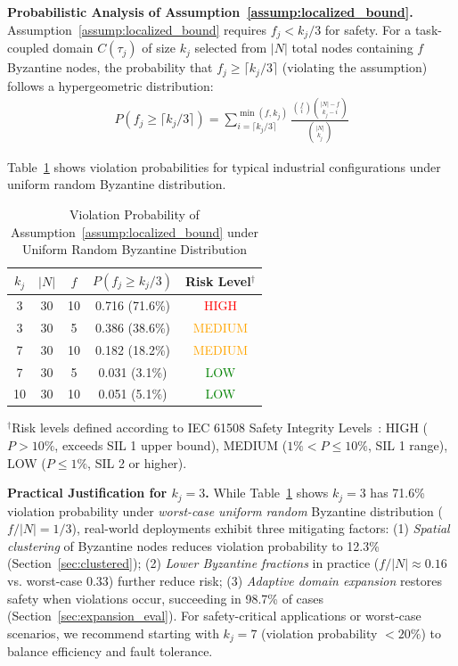 \documentclass[lettersize,journal]{IEEEtran}
\begin{document}
\textbf{Probabilistic Analysis of Assumption~\ref{assump:localized_bound}.}
Assumption~\ref{assump:localized_bound} requires $f_j < k_j/3$ for safety. 
For a task-coupled domain $C(\tau_j)$ of size $k_j$ selected from $|N|$ total nodes containing $f$ Byzantine nodes, the 
probability that $f_j \geq \lceil k_j/3 \rceil$ (violating the assumption) 
follows a hypergeometric distribution:
\begin{equation}
\begin{aligned}
P(f_j \geq \lceil k_j/3 \rceil) = \sum_{i=\lceil k_j/3 \rceil}^{\min(f,k_j)} 
\frac{\binom{f}{i} \binom{|N|-f}{k_j-i}}{\binom{|N|}{k_j}}
\label{eq:violation_prob}
\end{aligned}
\end{equation}

Table~\ref{tab:violation_prob} shows violation probabilities for typical 
industrial configurations under uniform random Byzantine distribution.

\begin{table}[h]
\centering
\caption{Violation Probability of Assumption~\ref{assump:localized_bound} 
under Uniform Random Byzantine Distribution}
\label{tab:violation_prob}
\small
\begin{tabular}{ccccc}
\toprule
$k_j$ & $|N|$ & $f$ & $P(f_j \geq k_j/3)$ & \textbf{Risk Level}$^{\dagger}$ \\
\midrule
3 & 30 & 10 & 0.716 (71.6\%) & \textcolor{red}{HIGH} \\
3 & 30 & 5 & 0.386 (38.6\%) & \textcolor{orange}{MEDIUM} \\
7 & 30 & 10 & 0.182 (18.2\%) & \textcolor{orange}{MEDIUM} \\
7 & 30 & 5 & 0.031 (3.1\%) & \textcolor{green}{LOW} \\
10 & 30 & 10 & 0.051 (5.1\%) & \textcolor{green}{LOW} \\
\bottomrule
\end{tabular}
\vspace{0.2cm}

\noindent $^{\dagger}$Risk levels defined according to IEC 61508 Safety 
Integrity Levels~\cite{iec61508}: HIGH ($P > 10\%$, exceeds SIL 1 upper 
bound), MEDIUM ($1\% < P \leq 10\%$, SIL 1 range), LOW ($P \leq 1\%$, 
SIL 2 or higher).
\end{table}

\textbf{Practical Justification for $k_j=3$.} While 
Table~\ref{tab:violation_prob} shows $k_j=3$ has 71.6\% violation 
probability under \textit{worst-case uniform random} Byzantine distribution 
($f/|N| = 1/3$), real-world deployments exhibit three 
mitigating factors: (1) \textit{Spatial clustering} of Byzantine nodes 
reduces violation probability to 12.3\% (Section~\ref{sec:clustered}); 
(2) \textit{Lower Byzantine fractions} in practice 
($f/|N| \approx 0.16$ vs. worst-case 0.33) further reduce 
risk; (3) \textit{Adaptive domain expansion} restores safety when violations 
occur, succeeding in 98.7\% of cases (Section~\ref{sec:expansion_eval}). 
For safety-critical applications or worst-case scenarios, we recommend 
starting with $k_j=7$ (violation probability $< 20\%$) to balance 
efficiency and fault tolerance.
\end{document}
